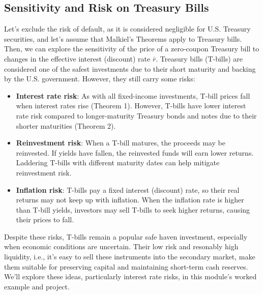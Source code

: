 \documentclass[11pt]{article}
\theoremstyle{definition}
\begin{document}
\subsection{Sensitivity and Risk on Treasury Bills}
Let's exclude the risk of default, as it is considered negligible for U.S. Treasury securities, and let's assume that Malkiel's Theorems apply to Treasury bills.
Then, we can explore the sensitivity of the price of a zero-coupon Treasury bill to changes in the effective interest (discount) rate $\bar{r}$.
Treasury bills (T-bills) are considered one of the safest investments due to their short maturity and backing by the U.S. government. 
However, they still carry some risks:
\begin{itemize}[leftmargin=*]
	\item{\textbf{Interest rate risk}: As with all fixed-income investments, T-bill prices fall when interest rates rise (Theorem 1). 
	However, T-bills have lower interest rate risk compared to longer-maturity Treasury bonds and notes due to their shorter maturities (Theorem 2).}
	\item{\textbf{Reinvestment risk}: When a T-bill matures, the proceeds may be reinvested. If yields have fallen, the reinvested funds will earn lower returns. Laddering T-bills with different maturity dates can help mitigate reinvestment risk.}
	\item{\textbf{Inflation risk}: T-bills pay a fixed interest (discount) rate, so their real returns may not keep up with inflation. When the inflation rate is higher than T-bill yields, investors may sell T-bills to seek higher returns, causing their prices to fall.}
\end{itemize}
Despite these risks, T-bills remain a popular safe haven investment, especially when economic conditions are uncertain. 
Their low risk and resonably high liquidity, i.e., it's easy to sell these instruments into the secondary market, make them suitable for preserving capital and maintaining short-term cash reserves.
We’ll explore these ideas, particularly interest rate risks, in this module’s worked example and project.
\end{document}
